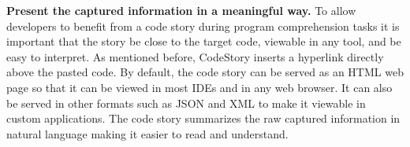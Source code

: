\documentclass[../manifest.tex]{subfiles}
\begin{document}
\textbf{Present the captured information in a meaningful way.} To allow developers to benefit from a code story during program comprehension tasks it is important that the story be close to the target code, viewable in any tool, and be easy to interpret. As mentioned before, CodeStory inserts a hyperlink directly above the pasted code. By default, the code story can be served as an HTML web page so that it can be viewed in most IDEs and in any web browser. It can also be served in other formats such as JSON and XML to make it viewable in custom applications. The code story summarizes the raw captured information in natural language making it easier to read and understand.
\end{document}
